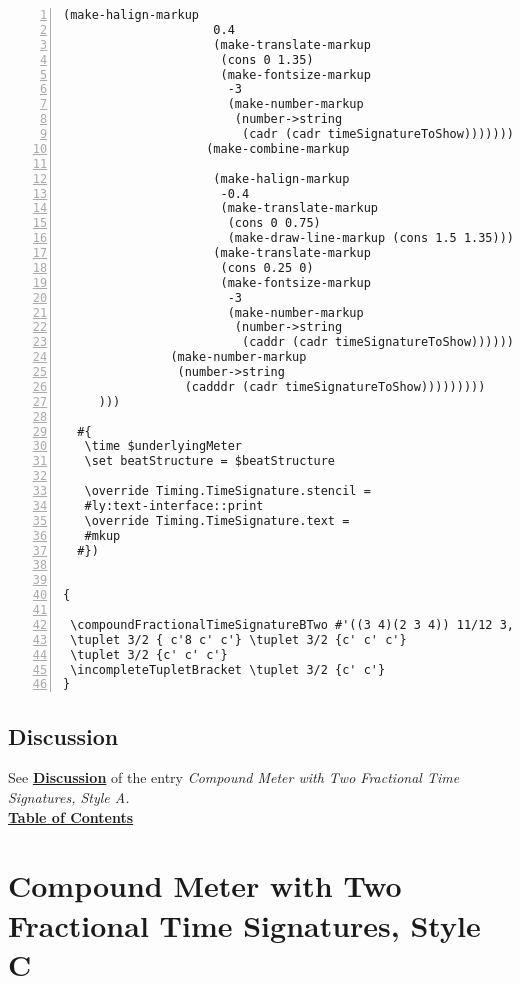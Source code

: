 \begin{Verbatim}[numbers=left,xleftmargin=5mm]
                    (make-halign-markup
                     0.4
                     (make-translate-markup
                      (cons 0 1.35)
                      (make-fontsize-markup
                       -3
                       (make-number-markup
                        (number->string
                         (cadr (cadr timeSignatureToShow)))))))
                    (make-combine-markup

                     (make-halign-markup
                      -0.4
                      (make-translate-markup
                       (cons 0 0.75)
                       (make-draw-line-markup (cons 1.5 1.35))))
                     (make-translate-markup
                      (cons 0.25 0)
                      (make-fontsize-markup
                       -3
                       (make-number-markup
                        (number->string
                         (caddr (cadr timeSignatureToShow))))))))))))
               (make-number-markup
                (number->string
                 (cadddr (cadr timeSignatureToShow)))))))))
     )))

  #{
   \time $underlyingMeter
   \set beatStructure = $beatStructure

   \override Timing.TimeSignature.stencil =
   #ly:text-interface::print
   \override Timing.TimeSignature.text =
   #mkup
  #})


{

 \compoundFractionalTimeSignatureBTwo #'((3 4)(2 3 4)) 11/12 3,3,3,2
 \tuplet 3/2 { c'8 c' c'} \tuplet 3/2 {c' c' c'}
 \tuplet 3/2 {c' c' c'}
 \incompleteTupletBracket \tuplet 3/2 {c' c'}
}
\end{Verbatim}
\subsection{Discussion}
See \hyperref[sec:compoundfractionalmeter_discussion]{\textbf{Discussion}} of the entry \textit{Compound Meter with Two Fractional Time Signatures, Style A.} \\
\hyperref[sec:toc]{\textbf{Table of Contents}}

\vfill \break




\section {Compound Meter with Two Fractional Time Signatures, Style C}

